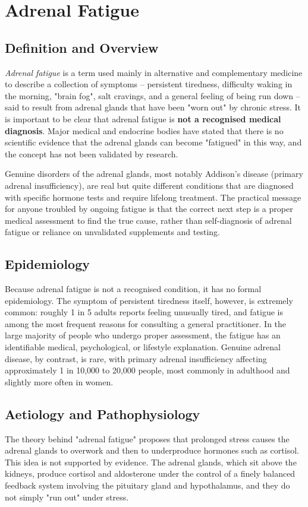 \chapter{Adrenal Fatigue}

\section*{Definition and Overview}
\textit{Adrenal fatigue} is a term used mainly in alternative and complementary medicine to describe a collection of symptoms -- persistent tiredness, difficulty waking in the morning, "brain fog", salt cravings, and a general feeling of being run down -- said to result from adrenal glands that have been "worn out" by chronic stress. It is important to be clear that adrenal fatigue is \textbf{not a recognised medical diagnosis}. Major medical and endocrine bodies have stated that there is no scientific evidence that the adrenal glands can become "fatigued" in this way, and the concept has not been validated by research.

Genuine disorders of the adrenal glands, most notably Addison's disease (primary adrenal insufficiency), are real but quite different conditions that are diagnosed with specific hormone tests and require lifelong treatment. The practical message for anyone troubled by ongoing fatigue is that the correct next step is a proper medical assessment to find the true cause, rather than self-diagnosis of adrenal fatigue or reliance on unvalidated supplements and testing.

\section*{Epidemiology}
Because adrenal fatigue is not a recognised condition, it has no formal epidemiology. The symptom of persistent tiredness itself, however, is extremely common: roughly 1 in 5 adults reports feeling unusually tired, and fatigue is among the most frequent reasons for consulting a general practitioner. In the large majority of people who undergo proper assessment, the fatigue has an identifiable medical, psychological, or lifestyle explanation. Genuine adrenal disease, by contrast, is rare, with primary adrenal insufficiency affecting approximately 1 in 10,000 to 20,000 people, most commonly in adulthood and slightly more often in women.

\section*{Aetiology and Pathophysiology}
The theory behind "adrenal fatigue" proposes that prolonged stress causes the adrenal glands to overwork and then to underproduce hormones such as cortisol. This idea is not supported by evidence. The adrenal glands, which sit above the kidneys, produce cortisol and aldosterone under the control of a finely balanced feedback system involving the pituitary gland and hypothalamus, and they do not simply "run out" under stress.

